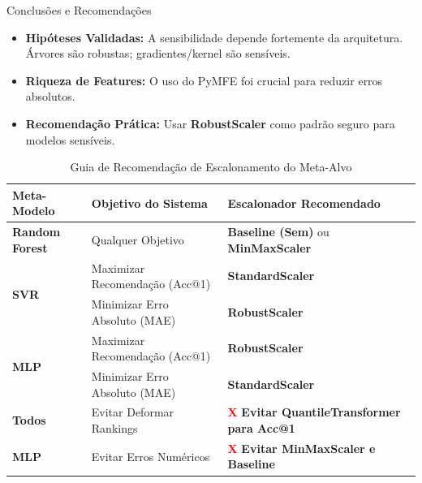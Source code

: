 \documentclass[aspectratio=169, 10pt]{beamer}
\begin{document}
\begin{frame}{Conclusões e Recomendações}
  \begin{itemize}
    \item \textbf{Hipóteses Validadas:} A sensibilidade depende fortemente da arquitetura. Árvores são robustas; gradientes/kernel são sensíveis.
    \item \textbf{Riqueza de Features:} O uso do PyMFE foi crucial para reduzir erros absolutos.
    \item \textbf{Recomendação Prática:} Usar \textbf{RobustScaler} como padrão seguro para modelos sensíveis.
  \end{itemize}
  
  \vspace{0.1cm}
  
  \begin{table}
    \centering
    \caption{Guia de Recomendação de Escalonamento do Meta-Alvo}
    \footnotesize
    \begin{tabular}{lll}
      \toprule
      \textbf{Meta-Modelo} & \textbf{Objetivo do Sistema} & \textbf{Escalonador Recomendado} \\
      \midrule
      \textbf{Random Forest} & Qualquer Objetivo & \textbf{Baseline (Sem)} ou \textbf{MinMaxScaler} \\
      \multirow{2}{*}{\textbf{SVR}} & Maximizar Recomendação (Acc@1) & \textbf{StandardScaler} \\
                            & Minimizar Erro Absoluto (MAE) & \textbf{RobustScaler} \\
      \multirow{2}{*}{\textbf{MLP}} & Maximizar Recomendação (Acc@1) & \textbf{RobustScaler} \\
                            & Minimizar Erro Absoluto (MAE) & \textbf{StandardScaler} \\
      \midrule
      \textbf{Todos} & Evitar Deformar Rankings & \textcolor{red}{\textbf{X}} \textbf{Evitar QuantileTransformer para Acc@1} \\
      \textbf{MLP} & Evitar Erros Numéricos & \textcolor{red}{\textbf{X}} \textbf{Evitar MinMaxScaler e Baseline} \\
      \bottomrule
    \end{tabular}
  \end{table}
\end{frame}
\end{document}
